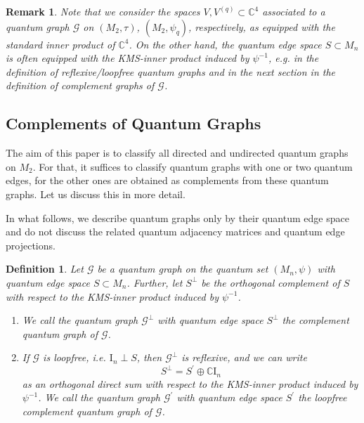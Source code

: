 \documentclass{amsart}
\newtheorem{definition}[thm]{Definition}
\newtheorem{remark}[thm]{Remark}
\newcommand{\C}{\mathbb{C}}
\begin{document}
\begin{remark}
    Note that we consider the spaces $V, V^{(q)} \subset \C^4$ associated to a quantum graph $\mathcal{G}$ on $(M_2, \tau)$, $(M_2, \psi_q)$, respectively, as equipped with the standard inner product of $\C^4$. On the other hand, the quantum edge space $S \subset M_n$ is often equipped with the KMS-inner product induced by $\psi^{-1}$, e.g. in the definition of reflexive/loopfree quantum graphs and in the next section in the definition of complement graphs of $\mathcal{G}$.
\end{remark}




\subsection{Complements of Quantum Graphs}
\label{subsec::complements_of_quantum_graphs}

The aim of this paper is to classify all directed and undirected quantum graphs on $M_2$. For that, it suffices to classify quantum graphs with one or two quantum edges, for the other ones are obtained as complements from these quantum graphs. Let us discuss this in more detail.

In what follows, we describe quantum graphs only by their quantum edge space and do not discuss the related quantum adjacency matrices and quantum edge projections.

\begin{definition}
\label{pre::def:(looopfree)_complement_of_qgraphs}
    Let $\mathcal{G}$ be a quantum graph on the quantum set $(M_n, \psi)$ with quantum edge space $S \subset M_n$. Further, let $S^\perp$ be the orthogonal complement of $S$ with respect to the KMS-inner product induced by $\psi^{-1}$.
    \begin{enumerate}
        \item We call the quantum graph $\mathcal{G}^\perp$ with quantum edge space $S^\perp$ the \emph{complement quantum graph} of $\mathcal{G}$. 
        \item If $\mathcal{G}$ is loopfree, i.e. $\mathrm{I}_n \perp S$, then $\mathcal{G}^\perp$ is reflexive, and we can write 
        $$
        S^\perp = S^\prime \oplus \C \mathrm{I}_n
        $$ 
        as an orthogonal direct sum with respect to the KMS-inner product induced by $\psi^{-1}$. We call the quantum graph $\mathcal{G}^\prime$ with quantum edge space $S^\prime$ the \emph{loopfree complement quantum graph} of $\mathcal{G}$.
    \end{enumerate}
\end{definition}
\end{document}
